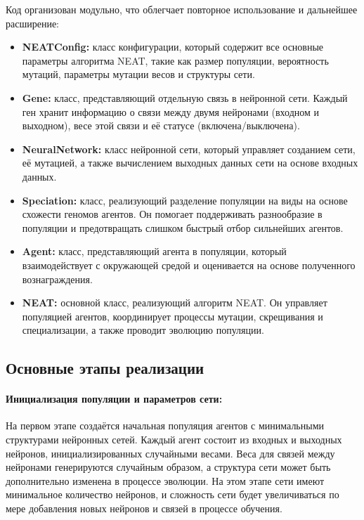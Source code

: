 \documentclass[a4paper,12pt]{article}
\begin{document}
Код организован модульно, что облегчает повторное использование и дальнейшее расширение:
\begin{itemize}
    \item \textbf{NEATConfig:} класс конфигурации, который содержит все основные параметры алгоритма NEAT, такие как размер популяции, вероятность мутаций, параметры мутации весов и структуры сети.
    \item \textbf{Gene:} класс, представляющий отдельную связь в нейронной сети. Каждый ген хранит информацию о связи между двумя нейронами (входном и выходном), весе этой связи и её статусе (включена/выключена).
    \item \textbf{NeuralNetwork:} класс нейронной сети, который управляет созданием сети, её мутацией, а также вычислением выходных данных сети на основе входных данных.
    \item \textbf{Speciation:} класс, реализующий разделение популяции на виды на основе схожести геномов агентов. Он помогает поддерживать разнообразие в популяции и предотвращать слишком быстрый отбор сильнейших агентов.
    \item \textbf{Agent:} класс, представляющий агента в популяции, который взаимодействует с окружающей средой и оценивается на основе полученного вознаграждения.
    \item \textbf{NEAT:} основной класс, реализующий алгоритм NEAT. Он управляет популяцией агентов, координирует процессы мутации, скрещивания и специализации, а также проводит эволюцию популяции.
\end{itemize}

\subsection{Основные этапы реализации}

\paragraph{Инициализация популяции и параметров сети:}

На первом этапе создаётся начальная популяция агентов с минимальными структурами нейронных сетей. Каждый агент состоит из входных и выходных нейронов, инициализированных случайными весами. Веса для связей между нейронами генерируются случайным образом, а структура сети может быть дополнительно изменена в процессе эволюции. На этом этапе сети имеют минимальное количество нейронов, и сложность сети будет увеличиваться по мере добавления новых нейронов и связей в процессе обучения.
\end{document}
